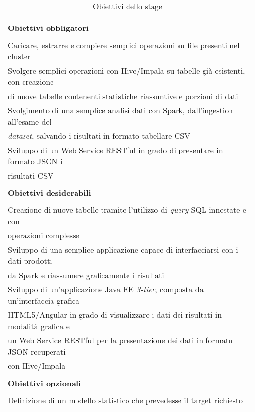 \begin{table}%
	\caption{Obiettivi dello stage}
	\label{tab:obiettivi-stage}
	\begin{tabular}{|l|}
		\hline
		\\
		\textbf{Obiettivi obbligatori}\\
		\\
		\hline
		Caricare, estrarre e compiere semplici operazioni su file presenti nel \gls{cluster}	\\
		\hline
		Svolgere semplici operazioni con Hive/Impala su tabelle già esistenti, con creazione \\ di nuove tabelle contenenti statistiche riassuntive e porzioni di dati	\\
		\hline
		Svolgimento di una semplice analisi dati con Spark, dall'ingestion all'esame del \\ \textit{dataset}, salvando i risultati in formato tabellare CSV	\\
		\hline
		Sviluppo di un \gls{Web Service} RESTful in grado di presentare in formato JSON i \\ risultati CSV \\
		\hline
		\hline
		\\
		\textbf{Obiettivi desiderabili}\\
		\\
		\hline
		Creazione di nuove tabelle tramite l'utilizzo di \textit{query} SQL innestate e con \\ operazioni complesse \\
		\hline
		Sviluppo di una semplice applicazione capace di interfacciarsi con i dati prodotti \\ da Spark e riassumere graficamente i risultati \\
		\hline
		Sviluppo di un'applicazione Java EE \textit{3-tier}, composta da un'interfaccia grafica \\ HTML5/Angular in grado di visualizzare i dati dei risultati in modalità grafica e \\ un Web Service RESTful per la presentazione dei dati in formato JSON recuperati \\ con Hive/Impala \\
		\hline
		\hline
		\\
		\textbf{Obiettivi opzionali}\\
		\\
		\hline
		Definizione di un modello statistico che prevedesse il target richiesto \\
		\hline
	\end{tabular}
\end{table}%

